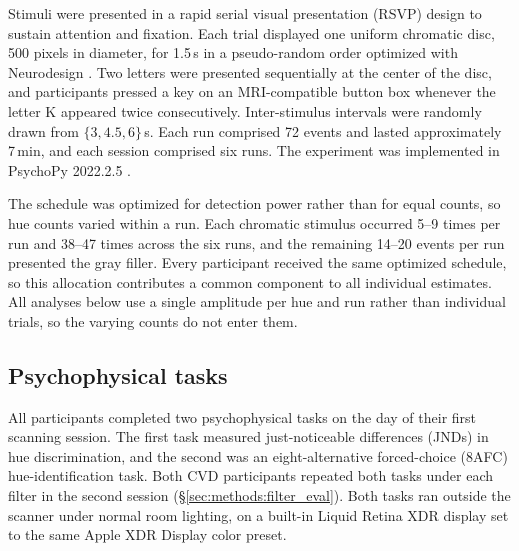 Stimuli were presented in a rapid serial visual presentation (RSVP) design to sustain attention and fixation. Each trial displayed one uniform chromatic disc, 500 pixels in diameter, for 1.5\,s in a pseudo-random order optimized with Neurodesign \parencite{durnez2018}. Two letters were presented sequentially at the center of the disc, and participants pressed a key on an MRI-compatible button box whenever the letter K appeared twice consecutively. Inter-stimulus intervals were randomly drawn from $\{3, 4.5, 6\}$\,s. Each run comprised 72 events and lasted approximately 7\,min, and each session comprised six runs. The experiment was implemented in PsychoPy 2022.2.5 \parencite{peirce2019}.

The schedule was optimized for detection power rather than for equal counts, so hue counts varied within a run. Each chromatic stimulus occurred 5--9 times per run and 38--47 times across the six runs, and the remaining 14--20 events per run presented the gray filler. Every participant received the same optimized schedule, so this allocation contributes a common component to all individual estimates. All analyses below use a single amplitude per hue and run rather than individual trials, so the varying counts do not enter them.

\subsection{Psychophysical tasks}
\label{sec:methods:psychophysical}

All participants completed two psychophysical tasks on the day of their first scanning session. The first task measured just-noticeable differences (JNDs) in hue discrimination, and the second was an eight-alternative forced-choice (8AFC) hue-identification task. Both CVD participants repeated both tasks under each filter in the second session (\S\ref{sec:methods:filter_eval}). Both tasks ran outside the scanner under normal room lighting, on a built-in Liquid Retina XDR display set to the same Apple XDR Display color preset.

